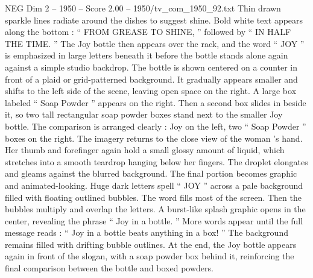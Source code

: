 \begin{textsample}{NEG Dim 2 – 1950 – Score 2.00 – 1950/tv\_com\_1950\_92.txt}
Thin drawn sparkle lines radiate around the dishes to suggest shine.
Bold white text appears along the bottom : “ FROM GREASE TO SHINE, ” followed by “ IN HALF THE TIME. ” The Joy bottle then appears over the rack, and the word “ JOY ” is emphasized in large letters beneath it before the bottle stands alone again against a simple studio backdrop.
The bottle is shown centered on a counter in front of a plaid or grid-patterned background.
It gradually appears smaller and shifts to the left side of the scene, leaving open space on the right.
A large box labeled “ Soap Powder ” appears on the right.
Then a second box slides in beside it, so two tall rectangular soap powder boxes stand next to the smaller Joy bottle.
The comparison is arranged clearly : Joy on the left, two “ Soap Powder ” boxes on the right.
The imagery returns to the close view of the woman ’s hand.
Her thumb and forefinger again hold a small glossy amount of liquid, which stretches into a smooth teardrop hanging below her fingers.
The droplet elongates and gleams against the blurred background.
The final portion becomes graphic and animated-looking.
Huge dark letters spell “ JOY ” across a pale background filled with floating outlined bubbles.
The word fills most of the screen.
Then the bubbles multiply and overlap the letters.
A burst-like splash graphic opens in the center, revealing the phrase “ Joy in a bottle. ” More words appear until the full message reads : “ Joy in a bottle beats anything in a box! ” The background remains filled with drifting bubble outlines.
At the end, the Joy bottle appears again in front of the slogan, with a soap powder box behind it, reinforcing the final comparison between the bottle and boxed powders.

\end{textsample}
